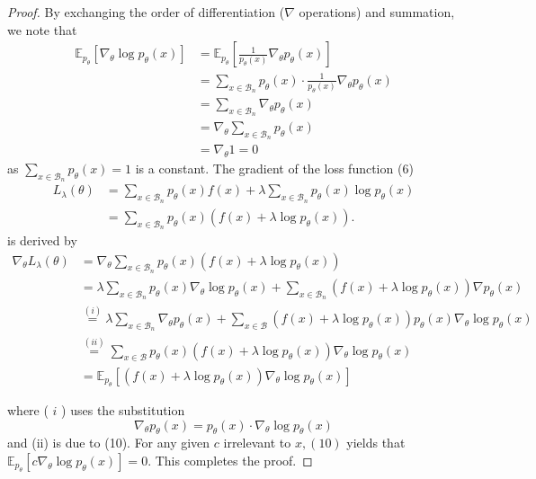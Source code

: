 \begin{proof}
    By exchanging the order of differentiation ($\nabla$ operations) and summation, we note that
\begin{align}
\mathbb{E}_{p_{\theta}}\left[\nabla_{\theta} \log p_{\theta}(x)\right]
&=\mathbb{E}_{p_{\theta}}\left[ \frac{1}{p_{\theta}(x)}\nabla_{\theta} p_{\theta}(x)\right] \\
&=\sum_{x \in \mathcal{B}_{n}} p_{\theta}(x) \cdot \frac{1}{p_{\theta}(x)}\nabla_{\theta} p_{\theta}(x)\\
&=\sum_{x \in \mathcal{B}_{n}} \nabla_{\theta} p_{\theta}(x) \\
&=\nabla_{\theta} \sum_{x \in \mathcal{B}_{n}} p_{\theta}(x) \\
&=\nabla_{\theta} 1=0 \tag{10}
\end{align}
as $\sum_{x \in \mathcal{B}_{n}} p_{\theta}(x)=1$ is a constant. The gradient of the loss function (6) 
\begin{align}
    L_{\lambda}(\theta) &= \sum_{x \in \mathcal{B}_n} p_\theta(x) f(x)+ \lambda \sum_{x \in \mathcal{B}_n} p_\theta(x) \log p_\theta(x) \\
    & = \sum_{x \in \mathcal{B}_n} p_\theta(x)\left(f(x)+\lambda \log p_\theta(x)\right).
\end{align}
is derived by
\begin{equation}
\begin{aligned}
\nabla_{\theta} L_{\lambda}(\theta) & =\nabla_{\theta} \sum_{x \in \mathcal{B}_{n}} p_{\theta}(x)\left(f(x)+\lambda \log p_{\theta}(x)\right) \\
& =\lambda \sum_{x \in \mathcal{B}_{n}} p_{\theta}(x) \nabla_{\theta} \log p_{\theta}(x)+\sum_{x \in \mathcal{B}_{n}}\left(f(x)+\lambda \log p_{\theta}(x)\right) \nabla p_{\theta}(x) \\
& \stackrel{(i)}{=} \lambda \sum_{x \in \mathcal{B}_{n}} \nabla_{\theta} p_{\theta}(x)+\sum_{x \in \mathcal{B}}\left(f(x)+\lambda \log p_{\theta}(x)\right) p_{\theta}(x) \nabla_{\theta} \log p_{\theta}(x) \\
& \stackrel{(i i)}{=} \sum_{x \in \mathcal{B}} p_{\theta}(x) \left(f(x)+\lambda \log p_{\theta}(x)\right)  \nabla_{\theta} \log p_{\theta}(x) \\
& =\mathbb{E}_{p_{\theta}}\left[\left(f(x)+\lambda \log p_{\theta}(x)\right) \nabla_{\theta} \log p_{\theta}(x)\right]
\end{aligned}
\end{equation}

where ( $i$ ) uses the substitution 
\begin{equation}
    \nabla_{\theta} p_{\theta}(x)=p_{\theta}(x) \cdot \nabla_{\theta} \log p_{\theta}(x)
\end{equation}
and (ii) is due to (10). For any given $c$ irrelevant to $x,(10)$ yields that $\mathbb{E}_{p_{\theta}}\left[c \nabla_{\theta} \log p_{\theta}(x)\right]=0$. This completes the proof.
\end{proof}

